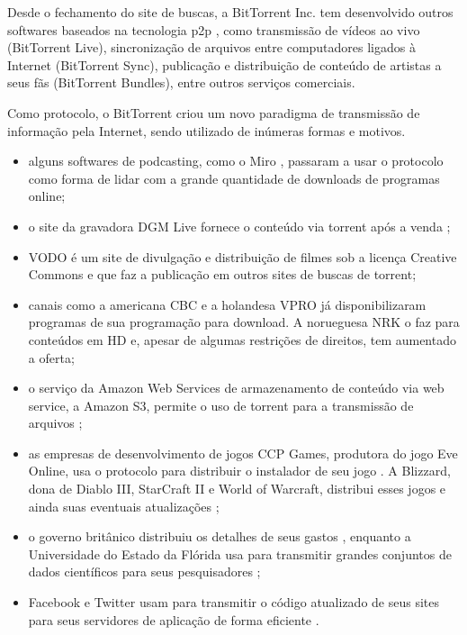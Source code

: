 Desde o fechamento do site de buscas, a BitTorrent Inc. tem desenvolvido outros
softwares baseados na tecnologia \gls*{p2p} \cite{site:bittorrent}, como transmissão de
vídeos ao vivo (BitTorrent Live), sincronização de arquivos entre computadores ligados
à Internet (BitTorrent Sync), publicação e distribuição de conteúdo de artistas a seus
fãs (BitTorrent Bundles), entre outros serviços comerciais.

Como protocolo, o BitTorrent criou um novo paradigma de transmissão de informação pela
Internet, sendo utilizado de inúmeras formas e motivos.

\begin{itemize}
    \item alguns softwares de podcasting, como o Miro \cite{site:miro}, passaram a
        usar o protocolo como forma de lidar com a grande quantidade de downloads de
        programas online;

    \item o site da gravadora DGM Live fornece o conteúdo via torrent após a venda
        \cite{site:dgm};

    \item VODO \cite{site:vodo} é um site de divulgação e distribuição de filmes sob a
        licença Creative Commons e que faz a publicação em outros sites de buscas de
        torrent;

    \item canais como a americana CBC \cite{site:cbc} e a holandesa VPRO
        \cite{site:vpro} já disponibilizaram programas de sua programação para
        download. A norueguesa NRK o faz para conteúdos em HD \cite{site:nrk} e,
        apesar de algumas restrições de direitos, tem aumentado a oferta;

    \item o serviço da Amazon Web Services de armazenamento de conteúdo via web service,
        a Amazon S3, permite o uso de torrent para a transmissão de arquivos
        \cite{site:aws-s3};

    \item as empresas de desenvolvimento de jogos CCP Games, produtora do jogo Eve
        Online, usa o protocolo para distribuir o instalador de seu jogo
        \cite{site:eve}. A Blizzard, dona de Diablo III, StarCraft II e World of
        Warcraft, distribui esses jogos e ainda suas eventuais atualizações
        \cite{site:blizzard};

    \item o governo britânico distribuiu os detalhes de seus gastos \cite{site:gov-uk},
        enquanto a Universidade do Estado da Flórida usa para transmitir grandes
        conjuntos de dados científicos para seus pesquisadores \cite{site:univ-fl};

    \item Facebook \cite{site:facebook-torrent} e Twitter \cite{site:twitter-torrent}
        usam para transmitir o código atualizado de seus sites para seus servidores de
        aplicação de forma eficiente \cite{site:twitter-torrent-power}.
\end{itemize}

